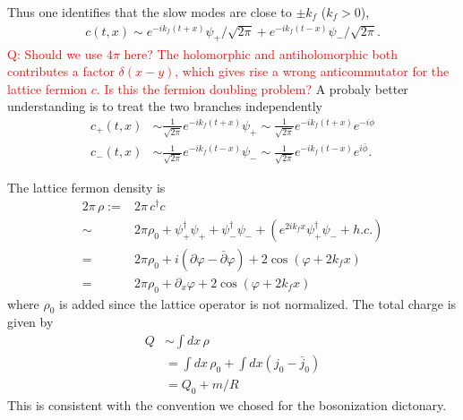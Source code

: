 Thus one identifies that the slow modes are close to $\pm k_f$ ($k_f > 0$),
\begin{equation}
	\begin{aligned}
		c\left(t,x\right) \sim e^{-ik_f \left( t+x \right)} \psi_{+}/\sqrt{2\pi} + e^{-ik_f\left(t-x\right)} \psi_{-}/\sqrt{2\pi}.
	\end{aligned}
\end{equation} 
\textcolor{red}{Q: Should we use $4\pi$ here? The holomorphic and antiholomorphic both contributes a factor $\delta(x-y)$, which gives rise a wrong anticommutator for the lattice fermion $c$. Is this the fermion doubling problem?} A probaly better understanding is to treat the two branches independently
\begin{equation}
	\begin{aligned}
		c_{+}\left(t,x\right) &\sim \frac{1}{\sqrt{2\pi}}e^{-ik_f \left( t+x \right)} \psi_{+} \sim \frac{1}{\sqrt{2\pi}}e^{-ik_f \left( t+x \right)} e^{-i\phi} \\
		c_{-}\left(t,x\right) &\sim \frac{1}{\sqrt{2\pi}}e^{-ik_f\left(t-x\right)} \psi_{-} \sim \frac{1}{\sqrt{2\pi}}e^{-ik_f\left(t-x\right)} e^{i\bar{\phi}}.
	\end{aligned}
\end{equation}


The lattice fermon density is 
\begin{equation}
	\begin{aligned}
		2\pi\,\rho :=& 2\pi\,c^\dagger c \\
		\sim& 2\pi \rho_0 + \psi_{+}^\dagger \psi_{+} + \psi_{-}^\dagger \psi_{-} + \left(e^{2i k_f x}\psi_{+}^\dagger \psi_{-} + h.c. \right) \\
		=&  2\pi \rho_0 +  i \left(\partial \varphi - \bar{\partial} \varphi\right) + 2 \cos (\varphi + 2k_f x) \\
		=& 2\pi \rho_0 +  \partial_x \varphi + 2 \cos (\varphi + 2k_f x)
	\end{aligned}
\end{equation}
where $\rho_0$ is added since the lattice operator is not normalized. The total charge is given by 
\begin{equation}
	\begin{aligned}
		Q &\sim \int dx\, \rho  \\
		&= \int dx \, \rho_0 + \int dx \left(j_0-\bar{j}_0\right)\\
		&= Q_0 + m/R
	\end{aligned}
\end{equation}
This is consistent with the convention we chosed for the bosonization dictonary.
\\

